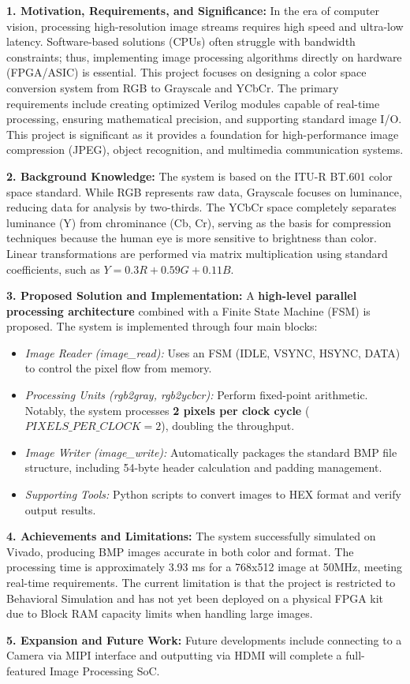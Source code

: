 
\textbf{1. Motivation, Requirements, and Significance:}  
In the era of computer vision, processing high-resolution image streams requires high speed and ultra-low latency. Software-based solutions (CPUs) often struggle with bandwidth constraints; thus, implementing image processing algorithms directly on hardware (FPGA/ASIC) is essential. This project focuses on designing a color space conversion system from RGB to Grayscale and YCbCr. The primary requirements include creating optimized Verilog modules capable of real-time processing, ensuring mathematical precision, and supporting standard image I/O. This project is significant as it provides a foundation for high-performance image compression (JPEG), object recognition, and multimedia communication systems.

\textbf{2. Background Knowledge:}  
The system is based on the ITU-R BT.601 color space standard. While RGB represents raw data, Grayscale focuses on luminance, reducing data for analysis by two-thirds. The YCbCr space completely separates luminance (Y) from chrominance (Cb, Cr), serving as the basis for compression techniques because the human eye is more sensitive to brightness than color. Linear transformations are performed via matrix multiplication using standard coefficients, such as $Y = 0.3R + 0.59G + 0.11B$.

\textbf{3. Proposed Solution and Implementation:}  
A \textbf{high-level parallel processing architecture} combined with a Finite State Machine (FSM) is proposed. The system is implemented through four main blocks:
\begin{itemize}
    \item \textit{Image Reader (image\_read):} Uses an FSM (IDLE, VSYNC, HSYNC, DATA) to control the pixel flow from memory.
    \item \textit{Processing Units (rgb2gray, rgb2ycbcr):} Perform fixed-point arithmetic. Notably, the system processes \textbf{2 pixels per clock cycle} ($PIXELS\_PER\_CLOCK = 2$), doubling the throughput.
    \item \textit{Image Writer (image\_write):} Automatically packages the standard BMP file structure, including 54-byte header calculation and padding management.
    \item \textit{Supporting Tools:} Python scripts to convert images to HEX format and verify output results.
\end{itemize}

\textbf{4. Achievements and Limitations:}  
The system successfully simulated on Vivado, producing BMP images accurate in both color and format. The processing time is approximately 3.93 ms for a 768x512 image at 50MHz, meeting real-time requirements. The current limitation is that the project is restricted to Behavioral Simulation and has not yet been deployed on a physical FPGA kit due to Block RAM capacity limits when handling large images.

\textbf{5. Expansion and Future Work:}  
Future developments include connecting to a Camera via MIPI interface and outputting via HDMI will complete a full-featured Image Processing SoC.